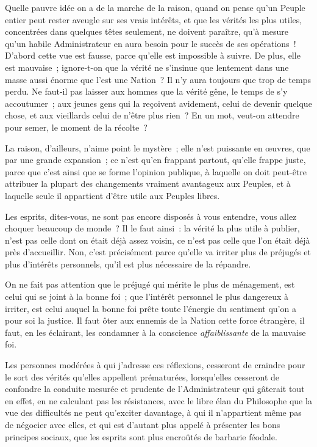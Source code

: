 \documentclass[french,twoside]{book} %
\begin{document}
Quelle pauvre idée on a de la marche de la raison, quand on pense qu’un Peuple entier peut rester aveugle sur ses vrais intérêts, et que les vérités les plus utiles, concentrées dans quelques têtes seulement, ne doivent paraître, qu’à mesure qu’un habile Administrateur en aura besoin pour le succès de ses opérations ! D’abord cette vue est fausse, parce qu’elle est impossible à suivre. De plus, elle est mauvaise ; ignore-t-on que la vérité ne s’insinue que lentement dans une masse aussi énorme que l’est une Nation ? Il n’y aura toujours que trop de temps perdu. Ne faut-il pas laisser aux hommes que la vérité gêne, le temps de s’y accoutumer ; aux jeunes gens qui la reçoivent avidement, celui de devenir quelque chose, et aux vieillards celui de n’être plus rien ? En un mot, veut-on attendre pour semer, le moment de la récolte ?\par
La raison, d’ailleurs, n’aime point le mystère ; elle n’est puissante en œuvres, que par une grande expansion ; ce n’est qu’en frappant partout, qu’elle frappe juste, parce que c’est ainsi que se forme l’opinion publique, à laquelle on doit peut-être attribuer la plupart des changements vraiment avantageux aux Peuples, et à laquelle seule il appartient d’être utile aux Peuples libres.\par
Les esprits, dites-vous, ne sont pas encore disposés à vous entendre, vous allez choquer beaucoup de monde ? Il le faut ainsi : la vérité la plus utile à publier, n’est pas celle dont on était déjà assez voisin, ce n’est pas celle que l’on était déjà près d’accueillir. Non, c’est précisément parce qu’elle va irriter plus de préjugés et plus d’intérêts personnels, qu’il est plus nécessaire de la répandre.\par
On ne fait pas attention que le préjugé qui mérite le plus de ménagement, est celui qui se joint à la bonne foi ; que l’intérêt personnel le plus dangereux à irriter, est celui auquel la bonne foi prête toute l’énergie du sentiment qu’on a pour soi la justice. Il faut ôter aux ennemis de la Nation cette force étrangère, il faut, en les éclairant, les condamner à la conscience {\itshape affaiblissante} de la mauvaise foi.\par
Les personnes modérées à qui j’adresse ces réflexions, cesseront de craindre pour le sort des vérités qu’elles appellent prématurées, lorsqu’elles cesseront de confondre la conduite mesurée et prudente de l’Administrateur qui gâterait tout en effet, en ne calculant pas les résistances, avec le libre élan du Philosophe que la vue des difficultés ne peut qu’exciter davantage, à qui il n’appartient même pas de négocier avec elles, et qui est d’autant plus appelé à présenter les bons principes sociaux, que les esprits sont plus encroûtés de barbarie féodale.\par
\end{document}
